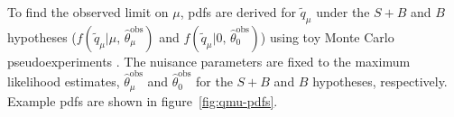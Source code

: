 \begin{appendices}
To find the observed limit on $\mu$, pdfs are derived for $\tilde{q}_{\mu}$ under the $S+B$ and $B$ hypotheses ($f(\tilde{q}_{\mu}|\mu,\,\hat{\theta}_{\mu}^{\mathrm{obs}})$ and $f(\tilde{q}_{\mu}|0,\,\hat{\theta}_{0}^{\mathrm{obs}})$) using toy Monte Carlo pseudoexperiments
. The nuisance parameters are fixed to the maximum likelihood estimates, $\hat{\theta}_{\mu}^{\mathrm{obs}}$ and $\hat{\theta}_{0}^{\mathrm{obs}}$ for the $S+B$ and $B$ hypotheses, respectively. Example pdfs are shown in figure~\ref{fig:qmu-pdfs}. 

\begin{figure}[htbp]
  \centering
  \hfill
  \hfill
\end{figure}
\end{appendices}
